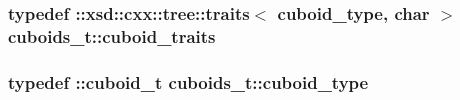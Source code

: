 \hypertarget{classcuboids__t_a070c3f6592d095cd861a6e1f31271ae2}{
\subsubsection[{cuboid\-\_\-traits}]{\setlength{\rightskip}{0pt plus 5cm}typedef \-::xsd\-::cxx\-::tree\-::traits$<$ {\bf cuboid\-\_\-type}, char $>$ {\bf cuboids\-\_\-t\-::cuboid\-\_\-traits}}}\label{classcuboids__t_a070c3f6592d095cd861a6e1f31271ae2}
\hypertarget{classcuboids__t_a7c920a1afd759302a5672d5ba2eb9707}{
\subsubsection[{cuboid\-\_\-type}]{\setlength{\rightskip}{0pt plus 5cm}typedef \-::{\bf cuboid\-\_\-t} {\bf cuboids\-\_\-t\-::cuboid\-\_\-type}}}\label{classcuboids__t_a7c920a1afd759302a5672d5ba2eb9707}


